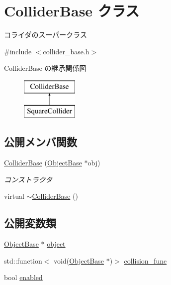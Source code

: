 \hypertarget{class_collider_base}{}\section{Collider\+Base クラス}
\label{class_collider_base}


コライダのスーパークラス  




{\ttfamily \#include $<$collider\+\_\+base.\+h$>$}

Collider\+Base の継承関係図\begin{figure}[H]
\begin{center}
\leavevmode
\includegraphics[height=2.000000cm]{class_collider_base}
\end{center}
\end{figure}
\subsection*{公開メンバ関数}
\begin{DoxyCompactItemize}
\item 
\mbox{\hyperlink{class_collider_base_a0d407592309c7cc2ee3fbd9ed8ff90fd}{Collider\+Base}} (\mbox{\hyperlink{class_object_base}{Object\+Base}} $\ast$obj)
\begin{DoxyCompactList}\small\item\em コンストラクタ \end{DoxyCompactList}\item 
virtual \mbox{\hyperlink{class_collider_base_a485c8a6348a053228aa61142a71e48fb}{$\sim$\+Collider\+Base}} ()
\end{DoxyCompactItemize}
\subsection*{公開変数類}
\begin{DoxyCompactItemize}
\item 
\mbox{\hyperlink{class_object_base}{Object\+Base}} $\ast$ \mbox{\hyperlink{class_collider_base_a63adac6a75877857abe9ff2cf4274157}{object}}
\item 
std\+::function$<$ void(\mbox{\hyperlink{class_object_base}{Object\+Base}} $\ast$)$>$ \mbox{\hyperlink{class_collider_base_a8b948d3373acccf67573bcb6029f7572}{collision\+\_\+func}}
\item 
bool \mbox{\hyperlink{class_collider_base_a812053f247dc6357357bdf9353dded77}{enabled}}
\end{DoxyCompactItemize}


